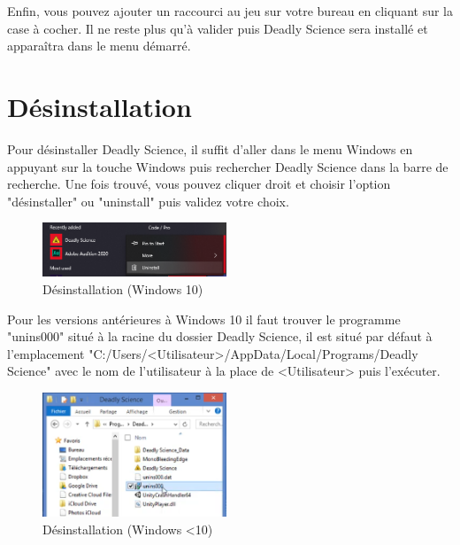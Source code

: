 \documentclass{article}
\begin{document}
Enfin, vous pouvez ajouter un raccourci au jeu sur votre bureau en cliquant sur la case à cocher.
Il ne reste plus qu'à valider puis Deadly Science sera installé et apparaîtra dans le menu démarré.

\newpage
\section{Désinstallation}

Pour désinstaller Deadly Science, il suffit d'aller dans le menu Windows en appuyant sur la touche Windows puis rechercher Deadly Science dans la barre de recherche.
Une fois trouvé, vous pouvez cliquer droit et choisir l'option "désinstaller" ou "uninstall" puis validez votre choix. 

\begin{figure}[H]
	\centering
	\includegraphics[width=0.49\textwidth]{setup/unins10.png}
	\caption{Désinstallation (Windows 10)}
	\label{setup_3}
\end{figure}

Pour les versions antérieures à Windows 10 il faut trouver le programme "unins000" situé à la racine du dossier Deadly Science, il est situé par défaut à l'emplacement "C:/Users/<Utilisateur>/AppData/Local/Programs/Deadly Science" avec le nom de l'utilisateur à la place de <Utilisateur> puis l'exécuter.

\begin{figure}[H]
	\centering
	\includegraphics[width=0.49\textwidth]{setup/unins.png}
	\caption{Désinstallation (Windows <10)}
	\label{setup_4}
\end{figure}
\end{document}
